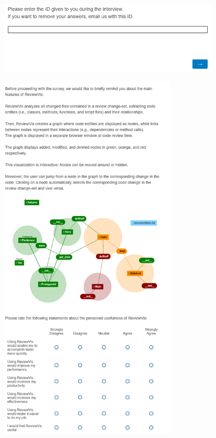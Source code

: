 \documentclass[a4paper,11pt,twoside]{article}
\theoremstyle{definition} %
\begin{document}
\begin{figure}[h]
    \centering
    \includegraphics[width=1.0\textwidth]{Subfigures/Appendices/Questionnaire/questionnaire_2.PNG}
\end{figure}

\begin{figure}[h]
    \centering
    \includegraphics[width=0.8\textwidth]{Subfigures/Appendices/Questionnaire/questionnaire_3.PNG}
\end{figure}
\end{document}

